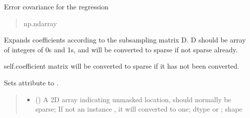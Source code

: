 \documentclass[letterpaper,10pt,english]{sphinxmanual}
\begin{document}
\begin{fulllineitems}
\begin{fulllineitems}
\begin{fulllineitems}
\label{\detokenize{kalman:glomar_gridding.autocorrelation.LassoEstimate_AR1.errcov}}
\pysigstartsignatures
\pysigline
{}
\pysigstopsignatures
\sphinxAtStartPar
Error covariance for the regression
\begin{quote}\begin{description}
\sphinxAtStartPar
np.ndarray

\end{description}\end{quote}

\end{fulllineitems}


\end{fulllineitems}


\begin{fulllineitems}
\label{\detokenize{kalman:glomar_gridding.autocorrelation.LassoEstimate_AR1.expand_coefficients}}
\pysigstartsignatures
\pysiglinewithargsret
{}
{\sphinxparamcomma {}\sphinxparamcomma {}\sphinxparamcomma {}}
{}
\pysigstopsignatures
\sphinxAtStartPar
Expands coefficients according to the subsampling
matrix D. D should be array of integers of 0s and 1s,
and will be converted to sparse if not sparse already.

\sphinxAtStartPar
self.coefficient matrix will be converted to sparse
if it has not been converted.

\sphinxAtStartPar
Sets attribute  to .
\begin{quote}\begin{description}
\begin{itemize}
\item {}
\sphinxAtStartPar
{} () \textendash{} A 2D array indicating unmasked location, should normally be sparse;
If not an instance , it will converted to one;
dtype  or ;
shape 


\end{itemize}
\end{description}
\end{quote}
\end{fulllineitems}
\end{fulllineitems}
\end{document}
